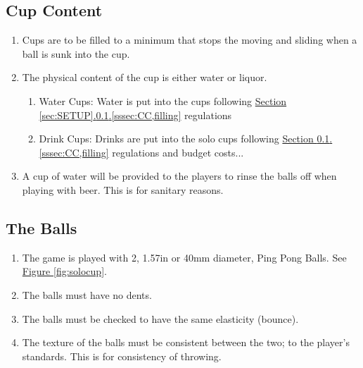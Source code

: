 	\subsection{Cup Content}\label{ssec:CupContent}
        \begin{enumerate}[label=(\roman*)]
            \item \label{sssec:CC,filling} Cups are to be filled to a minimum that stops the moving and sliding when a ball is sunk into the cup. 
            \item \label{sssec:CC,w_vs_l} The physical content of the cup is either water or liquor.
                \begin{enumerate}[label=(\alph*), leftmargin=2cm]
                    \item Water Cups: Water is put into the cups following \hyperref[sssec:CC,filling]{Section \ref{sec:SETUP}.\ref{ssec:CupContent}.\ref{sssec:CC,filling}} regulations
                    \item Drink Cups: Drinks are put into the solo cups following \hyperref[sssec:CC,filling]{Section \ref{ssec:CupContent}.\ref{sssec:CC,filling}} regulations and budget costs...
                \end{enumerate} 
            \item \label{sssec:CC,rinse} A cup of water will be provided to the players to rinse the balls off when playing with beer. This is for sanitary reasons. 
        \end{enumerate}        
    \subsection{The Balls}\label{ssec:Balls}
        \begin{enumerate}[label=(\roman*)]
            \item \label{sssec:Balls,num} The game is played with 2, 1.57in or 40mm diameter, Ping Pong Balls. See \hyperref[fig:solocup]{Figure \ref{fig:solocup}}.
            \item \label{sssec:Balls,dents} The balls must have no dents. 
            \item \label{sssec:Balls,bounce} The balls must be checked to have the same elasticity (bounce). 
            \item \label{sssec:Balls,texture} The texture of the balls must be consistent between the two; to the player's standards. This is for consistency of throwing. 
        \end{enumerate}    
